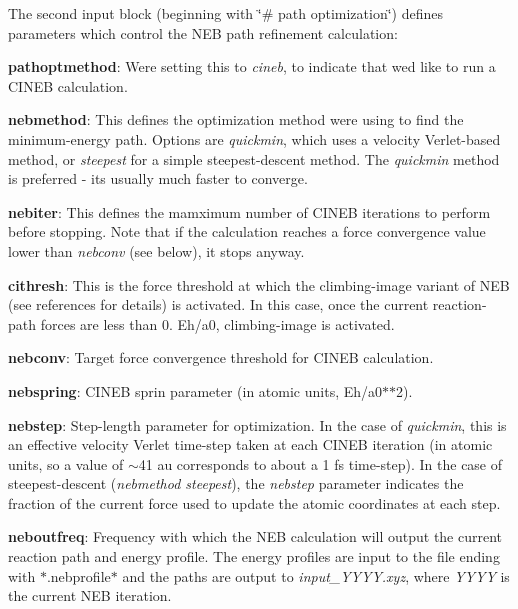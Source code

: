 The second input block (beginning with \char`\"{}\# path optimization\char`\"{}) defines parameters which control the N\+EB path refinement calculation\+:


\begin{DoxyItemize}
\item {\bfseries pathoptmethod}\+: We\textquotesingle{}re setting this to {\itshape cineb}, to indicate that we\textquotesingle{}d like to run a C\+I\+N\+EB calculation.
\item {\bfseries nebmethod}\+: This defines the optimization method we\textquotesingle{}re using to find the minimum-\/energy path. Options are {\itshape quickmin}, which uses a velocity Verlet-\/based method, or {\itshape steepest} for a simple steepest-\/descent method. The {\itshape quickmin} method is preferred -\/ it\textquotesingle{}s usually much faster to converge.
\item {\bfseries nebiter}\+: This defines the mamximum number of C\+I\+N\+EB iterations to perform before stopping. Note that if the calculation reaches a force convergence value lower than {\itshape nebconv} (see below), it stops anyway.
\item {\bfseries cithresh}\+: This is the force threshold at which the climbing-\/image variant of N\+EB (see references for details) is activated. In this case, once the current reaction-\/path forces are less than 0. Eh/a0, climbing-\/image is activated.
\item {\bfseries nebconv}\+: Target force convergence threshold for C\+I\+N\+EB calculation.
\item {\bfseries nebspring}\+: C\+I\+N\+EB sprin parameter (in atomic units, Eh/a0$\ast$$\ast$2).
\item {\bfseries nebstep}\+: Step-\/length parameter for optimization. In the case of {\itshape quickmin}, this is an effective velocity Verlet time-\/step taken at each C\+I\+N\+EB iteration (in atomic units, so a value of $\sim$41 au corresponds to about a 1 fs time-\/step). In the case of steepest-\/descent ({\itshape nebmethod steepest}), the {\itshape nebstep} parameter indicates the fraction of the current force used to update the atomic coordinates at each step.
\item {\bfseries neboutfreq}\+: Frequency with which the N\+EB calculation will output the current reaction path and energy profile. The energy profiles are input to the file ending with $\ast$.nebprofile$\ast$ and the paths are output to {\itshape input\+\_\+\+Y\+Y\+Y\+Y.\+xyz}, where {\itshape Y\+Y\+YY} is the current N\+EB iteration.
$$
\end{DoxyItemize}
